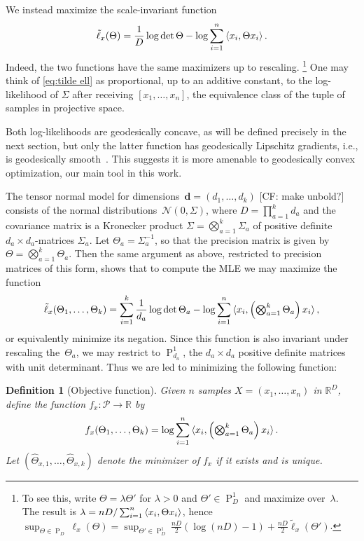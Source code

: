\documentclass{article}
\newtheorem{definition}{Definition}
\newcommand{\R}{{\mathbb{R}}}
\renewcommand{\vec}{\bm}
\newcommand\cN{\mathcal{N}}
\newcommand\PD{\operatorname{P}}
\newcommand\SPD{\mathcal{P}}
\newcommand\samp{x}
\newcommand\rv{X}
\newcommand{\CF}[1]{{\color{purple}[CF: #1]}}
\begin{document}
We instead maximize the scale-invariant function
\begin{align}\label{eq:tilde ell}
  \tilde\ell_{\samp}(\Theta) = \frac1D\log\det \Theta - \log \sum_{i=1}^n \braket{\samp_i, \Theta \samp_i}.
\end{align}
Indeed, the two functions have the same maximizers up to rescaling.%
\footnote{To see this, write $\Theta = \lambda \Theta'$ for $\lambda>0$ and $\Theta'\in\PD_D^1$ and maximize over~$\lambda$.
The result is $\lambda = n D / \sum_{i=1}^n \braket{\samp_i, \Theta \samp_i}$, hence $\sup_{\Theta\in\PD_D} \ell_{\samp}(\Theta) = \sup_{\Theta'\in\PD_D^1} \frac {nD}2 \left( \log(nD) - 1 \right) + \frac{nD}2 \tilde\ell_{\samp}(\Theta')$.}
One may think of \cref{eq:tilde ell} as proportional, up to an additive constant, to the log-likelihood of $\Sigma$ after receiving $[\samp_1, \dots, \samp_n]$, the equivalence class of the tuple of samples in projective space.

Both log-likelihoods are geodesically concave, as will be defined precisely in the next section, but only the latter function has geodesically Lipschitz gradients, i.e., is geodesically smooth~\cite{burgisser2019towards}.
This suggests it is more amenable to geodesically convex optimization, our main tool in this work.

The tensor normal model for dimensions~$\vec d=(d_1,\dots,d_k)$ \CF{make unbold?} consists of the normal distributions~$\cN(0,\Sigma)$, where $D = \prod_{a=1}^k d_a$ and the covariance matrix is a Kronecker product $\Sigma = \bigotimes_{a=1}^k \Sigma_a$ of positive definite $d_a\times d_a$-matrices $\Sigma_a$.
Let $\Theta_a = \Sigma_a^{-1}$, so that the precision matrix is given by $\Theta = \bigotimes_{a=1}^k \Theta_a$.
Then the same argument as above, restricted to precision matrices of this form, shows that to compute the MLE we may maximize the function
\begin{align*}
  \tilde\ell_{\samp}(\Theta_1,\dots,\Theta_k) = \sum_{i=1}^k \frac1{d_a} \log \det \Theta_a - \log \sum_{i=1}^n \braket{\samp_i, \left( \textstyle \bigotimes_{a=1}^k \Theta_a \right) \samp_i},
\end{align*}
or equivalently minimize its negation.
Since this function is also invariant under rescaling the~$\Theta_a$, we may restrict to $\PD_{d_a}^1$, the $d_a\times d_a$ positive definite matrices with unit determinant.
Thus we are led to minimizing the following function:

\begin{definition}[Objective function]\label{dfn:function}
Given $n$ samples $\rv = (\samp_1, \dots, \samp_n)$ in $\R^D$, define the function $f_{\samp}\colon \SPD \to \R$ by
\begin{align}\label{eq:projective-likelihood}
  f_{\samp}(\Theta_1,\dots,\Theta_k) = \log \sum_{i=1}^n \braket{\samp_i, \left( \textstyle \bigotimes_{a=1}^k \Theta_a \right) \samp_i}.
\end{align}
Let $(\widehat{\Theta}_{\samp,1}, \dots, \widehat{\Theta}_{\samp,k})$ denote the minimizer of $f_{\samp}$ if it exists and is unique.
\end{definition}
\end{document}

